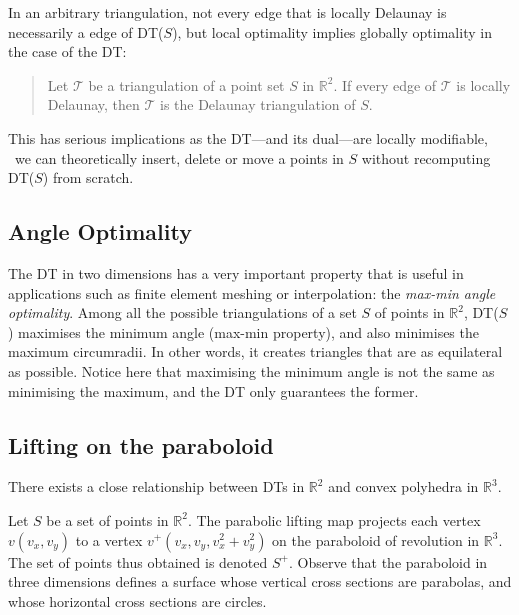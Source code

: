 In an arbitrary triangulation, not every edge that is locally Delaunay is necessarily a edge of DT($S$), but local optimality implies globally optimality in the case of the DT:
\begin{quote}
  Let $\mathcal{T}$ be a triangulation of a point set $S$ in $\mathbb{R}^2$. If every edge of $\mathcal{T}$ is locally Delaunay, then $\mathcal{T}$ is the Delaunay triangulation of $S$.
\end{quote}
This has serious implications as the DT---and its dual---are locally modifiable, \ie\ we can theoretically insert, delete or move a points in $S$ without recomputing DT($S$) from scratch.


%
\subsection{Angle Optimality}
The DT in two dimensions has a very important property that is useful in applications such as finite element meshing or interpolation: the \emph{max-min angle optimality}. Among all the possible triangulations of a set $S$ of points in $\mathbb{R}^2$, DT($S$) maximises the minimum angle (max-min property), and also minimises the maximum circumradii. 
In other words, it creates triangles that are as equilateral as possible. 
Notice here that maximising the minimum angle is not the same as minimising the maximum, and the DT only guarantees the former.


\subsection{Lifting on the paraboloid}
\label{sec:parabolic_lifting}

There exists a close relationship between DTs in $\mathbb{R}^{2}$ and convex polyhedra in $\mathbb{R}^{3}$. 

Let $S$ be a set of points in $\mathbb{R}^{2}$. 
The parabolic lifting map projects each vertex $v(v_{x}, v_{y})$ to a vertex $v^{+}(v_{x}, v_{y}, v_{x}^{2}+v_{y}^{2})$ on the paraboloid of revolution in $\mathbb{R}^{3}$. 
The set of points thus obtained is denoted $S^{+}$. 
Observe that the paraboloid in three dimensions defines a surface whose vertical cross sections are parabolas, and whose horizontal cross sections are circles. 

%

